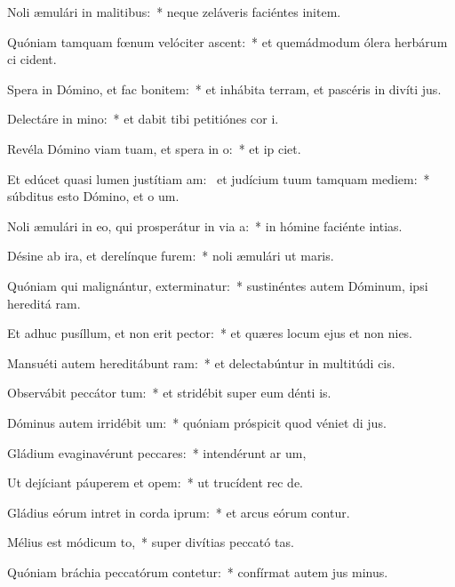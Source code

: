 \item Noli æmulári in malitibus:~* neque zeláveris faciéntes initem.
\item Quóniam tamquam fœnum velóciter ascent:~* et quemádmodum ólera herbárum ci cident.
\item Spera in Dómino, et fac bonitem:~* et inhábita terram, et pascéris in divíti jus.
\item Delectáre in mino:~* et dabit tibi petitiónes cor i.
\item Revéla Dómino viam tuam, et spera in o:~* et ip ciet.
\item Et edúcet quasi lumen justítiam am:~\pscross{} et judícium tuum tamquam mediem:~* súbditus esto Dómino, et o um.
\item Noli æmulári in eo, qui prosperátur in via a:~* in hómine faciénte intias.
\item Désine ab ira, et derelínque furem:~* noli æmulári ut maris.
\item Quóniam qui malignántur, exterminatur:~* sustinéntes autem Dóminum, ipsi hereditá ram.
\item Et adhuc pusíllum, et non erit pector:~* et quæres locum ejus et non nies.
\item Mansuéti autem hereditábunt ram:~* et delectabúntur in multitúdi cis.
\item Observábit peccátor tum:~* et stridébit super eum dénti is.
\item Dóminus autem irridébit um:~* quóniam próspicit quod véniet di jus.
\item Gládium evaginavérunt peccares:~* intendérunt ar um,
\item Ut dejíciant páuperem et opem:~* ut trucídent rec de.
\item Gládius eórum intret in corda iprum:~* et arcus eórum contur.
\item Mélius est módicum to,~* super divítias peccató tas.
\item Quóniam bráchia peccatórum contetur:~* confírmat autem jus minus.
